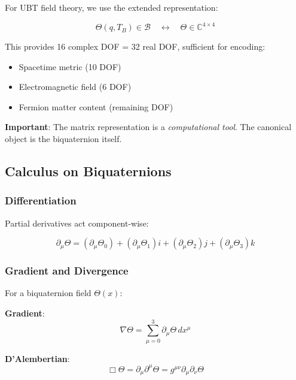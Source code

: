 For UBT field theory, we use the extended representation:

\begin{equation}
\Theta(q,T_B) \in \mathcal{B} \quad \leftrightarrow \quad \Theta \in \mathbb{C}^{4 \times 4}
\end{equation}

This provides 16 complex DOF = 32 real DOF, sufficient for encoding:
\begin{itemize}
    \item Spacetime metric (10 DOF)
    \item Electromagnetic field (6 DOF)
    \item Fermion matter content (remaining DOF)
\end{itemize}

\textbf{Important}: The matrix representation is a \emph{computational tool}. The canonical object is the biquaternion itself.

\subsection{Calculus on Biquaternions}

\subsubsection{Differentiation}

Partial derivatives act component-wise:

\begin{equation}
\partial_\mu \Theta = (\partial_\mu \Theta_0) + (\partial_\mu \Theta_1)i + (\partial_\mu \Theta_2)j + (\partial_\mu \Theta_3)k
\end{equation}

\subsubsection{Gradient and Divergence}

For a biquaternion field $\Theta(x)$:

\textbf{Gradient}:
\begin{equation}
\nabla \Theta = \sum_{\mu=0}^{3} \partial_\mu \Theta \, dx^\mu
\end{equation}

\textbf{D'Alembertian}:
\begin{equation}
\Box \Theta = \partial_\mu \partial^\mu \Theta = g^{\mu\nu} \partial_\mu \partial_\nu \Theta
\end{equation}

